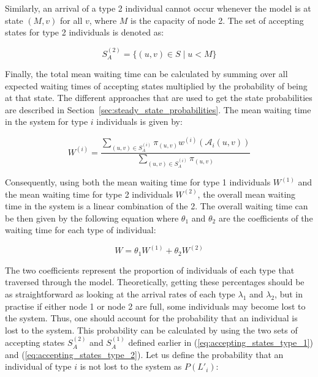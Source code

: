 Similarly, an arrival of a type 2 individual cannot occur whenever the model is
at state \((M, v)\) for all \(v\), where \(M\) is the capacity of node 2.
The set of accepting states for type 2 individuals is denoted as:

\begin{equation}\label{eq:accepting_states_type_2}
    S_A^{(2)} = \{(u, v) \in S \; | \; u < M \}
\end{equation}



Finally, the total mean waiting time can be calculated by summing over all
expected waiting times of accepting states multiplied by the probability of
being at that state.
The different approaches that are used to get the state probabilities are
described in Section~\ref{sec:steady_state_probabilities}.
The mean waiting time in the system for type \(i\) individuals is given by:

\begin{equation}\label{eq:recursive_waiting_time_for_type_i}
    W^{(i)} = \frac{\sum_{(u,v) \in S_A^{(i)}} \pi_{(u,v)} w^{(i)}
    (\mathcal{A}_i(u,v))}{\sum_{(u,v) \in S_A^{(i)}} \pi_{(u,v)}}
\end{equation}

Consequently, using both the mean waiting time for type 1 individuals
\(W^{(1)}\) and the mean waiting time for type 2 individuals \(W^{(2)}\), the
overall mean waiting time in the system is a linear combination of the 2.
The overall waiting time can be then given by the following equation where
\(\theta_1\) and \(\theta_2\) are the coefficients of the waiting time for each
type of individual:

\begin{equation}\label{eq:overall_waiting_time_coeff}
    W = \theta_1 W^{(1)} + \theta_2 W^{(2)}
\end{equation}

The two coefficients represent the proportion of individuals of each type that
traversed through the model.
Theoretically, getting these percentages should be as straightforward as
looking at the arrival rates of each type \(\lambda_1\) and \(\lambda_2\), but
in practise if either node 1 or node 2 are full, some
individuals may become lost to the system.
Thus, one should account for the probability that an individual is lost to the
system.
This probability can be calculated by using the two sets of accepting
states \(S_A^{(2)}\) and \(S_A^{(1)}\) defined earlier in
(\ref{eq:accepting_states_type_1}) and (\ref{eq:accepting_states_type_2}).
Let us define the probability that an individual of type \(i\) is not lost
to the system as \(P(L'_i)\):

